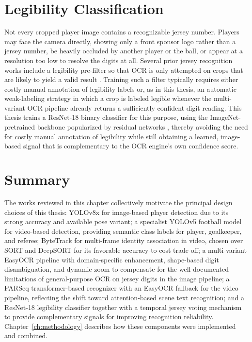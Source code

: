 \section{Legibility Classification}

Not every cropped player image contains a recognizable jersey number.
Players may face the camera directly, showing only a front sponsor
logo rather than a jersey number, be heavily occluded by another
player or the ball, or appear at a resolution too low to resolve the
digits at all. Several prior jersey recognition works include a
legibility pre-filter so that OCR is only attempted on crops that are
likely to yield a valid result \cite{li2018jersey}. Training such a
filter typically requires either costly manual annotation of legibility
labels or, as in this thesis, an automatic weak-labeling strategy in
which a crop is labeled legible whenever the multi-variant OCR pipeline
already returns a sufficiently confident digit reading. This thesis
trains a ResNet-18 binary classifier for this purpose, using the
ImageNet-pretrained backbone popularized by residual networks
\cite{he2016resnet,deng2009imagenet}, thereby avoiding the need for
costly manual annotation of legibility while still obtaining a learned,
image-based signal that is complementary to the OCR engine's own
confidence score.

\section{Summary}

The works reviewed in this chapter collectively motivate the principal
design choices of this thesis: YOLOv8x for image-based player
detection due to its strong accuracy and available pose variant; a
specialist YOLOv5 football model for video-based detection, providing
semantic class labels for player, goalkeeper, and referee; ByteTrack
for multi-frame identity association in video, chosen over SORT and
DeepSORT for its favorable accuracy-to-cost trade-off; a multi-variant
EasyOCR pipeline with domain-specific enhancement, shape-based digit
disambiguation, and dynamic zoom to compensate for the well-documented
limitations of general-purpose OCR on jersey digits in the image
pipeline; a PARSeq transformer-based recognizer with an EasyOCR
fallback for the video pipeline, reflecting the shift toward
attention-based scene text recognition; and a ResNet-18 legibility
classifier together with a temporal jersey voting mechanism to provide
complementary signals for improving recognition reliability.
Chapter~\ref{ch:methodology} describes how these components were
implemented and combined.
